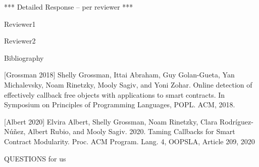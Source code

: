 *** Detailed Response -- per reviewer ***

Reviewer1

Reviewer2

Bibliography

[Grossman 2018] Shelly Grossman, Ittai Abraham, Guy Golan-Gueta, Yan Michalevsky, Noam Rinetzky, Mooly Sagiv, and Yoni Zohar. Online detection of effectively callback free objects with applications to smart contracts. In Symposium on Principles of Programming Languages, POPL. ACM, 2018.

[Albert 2020] Elvira Albert, Shelly Grossman, Noam Rinetzky, Clara Rodríguez-Núñez, Albert Rubio, and Mooly Sagiv. 2020. Taming Callbacks for Smart Contract Modularity. Proc. ACM Program. Lang. 4, OOPSLA, Article 209, 2020


QUESTIONS for us